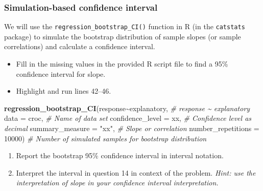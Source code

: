 \documentclass[
]{report}
\newenvironment{Shaded}{\begin{snugshade}}{\end{snugshade}}
\newcommand{\AttributeTok}[1]{\textcolor[rgb]{0.13,0.29,0.53}{#1}}
\newcommand{\CommentTok}[1]{\textcolor[rgb]{0.56,0.35,0.01}{\textit{#1}}}
\newcommand{\DecValTok}[1]{\textcolor[rgb]{0.00,0.00,0.81}{#1}}
\newcommand{\FunctionTok}[1]{\textcolor[rgb]{0.13,0.29,0.53}{\textbf{#1}}}
\newcommand{\NormalTok}[1]{#1}
\newcommand{\SpecialCharTok}[1]{\textcolor[rgb]{0.81,0.36,0.00}{\textbf{#1}}}
\newcommand{\StringTok}[1]{\textcolor[rgb]{0.31,0.60,0.02}{#1}}
\begin{document}
\subsubsection*{Simulation-based confidence interval}\label{simulation-based-confidence-interval}

We will use the \texttt{regression\_bootstrap\_CI()} function in R (in the \texttt{catstats} package) to simulate the bootstrap distribution of sample slopes (or sample correlations) and calculate a confidence interval.

\begin{itemize}
\item
  Fill in the missing values in the provided R script file to find a 95\% confidence interval for slope.
\item
  Highlight and run lines 42--46.
\end{itemize}

\begin{Shaded}
\begin{Highlighting}[]
\FunctionTok{regression\_bootstrap\_CI}\NormalTok{(response}\SpecialCharTok{\textasciitilde{}}\NormalTok{explanatory, }\CommentTok{\# response \textasciitilde{} explanatory}
   \AttributeTok{data =}\NormalTok{ croc, }\CommentTok{\# Name of data set}
   \AttributeTok{confidence\_level =}\NormalTok{ xx, }\CommentTok{\# Confidence level as decimal}
   \AttributeTok{summary\_measure =} \StringTok{"xx"}\NormalTok{, }\CommentTok{\# Slope or correlation}
   \AttributeTok{number\_repetitions =} \DecValTok{10000}\NormalTok{) }\CommentTok{\# Number of simulated samples for bootstrap distribution}
\end{Highlighting}
\end{Shaded}

\begin{enumerate}
\def\labelenumi{\arabic{enumi}.}
\setcounter{enumi}{12}
\item
  Report the bootstrap 95\% confidence interval in interval notation.\\
  \vspace{0.5in}
\item
  Interpret the interval in question 14 in context of the problem. \emph{Hint: use the interpretation of slope in your confidence interval interpretation.}
\end{enumerate}

\vspace{0.8in}
\end{document}

